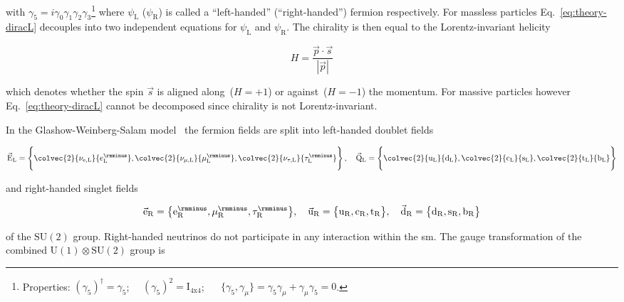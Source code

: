 with $\gamma_{5}=i\gamma_{0}\gamma_{1}\gamma_{2}\gamma_{3}$\footnote{Properties: $(\gamma_{5})^{\dagger}=\gamma_{5}$; ~~$(\gamma_{5})^2=\mathrm{I}_\mathrm{4x4}$; ~~ $\{\gamma_{5},\gamma_{\mu}\}=\gamma_{5}\gamma_{\mu}+\gamma_{\mu}\gamma_{5}=0$.} where $\psi_\mathrm{L}$ ($\psi_\mathrm{R}$) is called a ``left-handed'' (``right-handed'') fermion respectively. For massless particles Eq.~\ref{eq:theory-diracL} decouples into two independent equations for $\psi_\mathrm{L}$ and $\psi_\mathrm{R}$. The chirality is then equal to the Lorentz-invariant helicity

\begin{equation}
H=\frac{\vec{p}\cdot\vec{s}}{|\vec{p}|}
\end{equation}

which denotes whether the spin $\vec{s}$ is aligned along~($H=+1$) or against~($H=-1$) the momentum. For massive particles however Eq.~\ref{eq:theory-diracL} cannot be decomposed since chirality is not Lorentz-invariant.

In the Glashow-Weinberg-Salam model~\cite{Salam:1964ry,Weinberg:1967tq,Glashow:1961tr} the fermion fields are split into left-handed doublet fields

\begin{align}
\vec{\mathrm{E}}_\mathrm{L}=\Bigg\{\colvec{2}{\nu_\mathrm{e,L}}{e^{\rmminus}_\mathrm{L}},\colvec{2}{\nu_{\mu,\mathrm{L}}}{\mu^{\rmminus}_\mathrm{L}},\colvec{2}{\nu_{\tau,\mathrm{L}}}{\tau^{\rmminus}_\mathrm{L}}\Bigg\} \label{eq:theory-su2-doublets}\,,\quad
\vec{\mathrm{Q}}_\mathrm{L}=\Bigg\{\colvec{2}{\mathrm{u}_\mathrm{L}}{\mathrm{d}_\mathrm{L}},\colvec{2}{\mathrm{c}_\mathrm{L}}{\mathrm{s}_\mathrm{L}},\colvec{2}{\mathrm{t}_\mathrm{L}}{\mathrm{b}_\mathrm{L}}\Bigg\} 
\end{align}

and right-handed singlet fields

\begin{align}
\vec{\mathrm{e}}_\mathrm{R}=\big\{\mathrm{e}^{\rmminus}_\mathrm{R},\mu^{\rmminus}_\mathrm{R},\tau^{\rmminus}_\mathrm{R}\big\},\quad\vec{\mathrm{u}}_\mathrm{R}=\big\{\mathrm{u}_\mathrm{R},\mathrm{c}_\mathrm{R},\mathrm{t}_\mathrm{R}\big\},\quad\vec{\mathrm{d}}_\mathrm{R}=\big\{\mathrm{d}_\mathrm{R},\mathrm{s}_\mathrm{R},\mathrm{b}_\mathrm{R}\big\} \label{eq:theory-su2-singlets}
\end{align}

of the $\mathrm{SU(2)}$ group. Right-handed neutrinos do not participate in any interaction within the \gls{sm}. The gauge transformation of the combined $\mathrm{U(1)}\otimes \mathrm{SU(2)}$ group is

